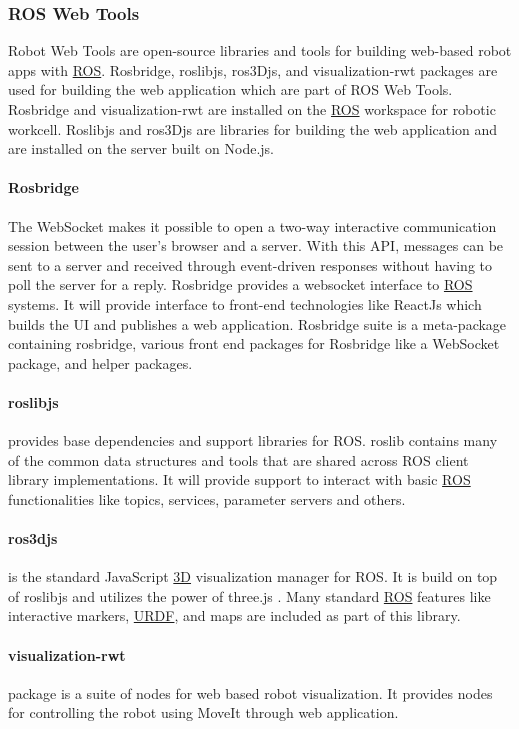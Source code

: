 \subsubsection{ROS Web Tools}
\label{subsubsec:rosweb}

Robot Web Tools are open-source libraries and tools for building web-based robot apps with \hyperref[acro:ROS]{ROS}. Rosbridge, roslibjs, ros3Djs, and visualization-rwt packages
are used for building the web application which are part of ROS Web Tools. \cite{webtools} Rosbridge and visualization-rwt are installed on the \hyperref[acro:ROS]{ROS} workspace
for robotic workcell. Roslibjs and ros3Djs are libraries for building the web application and are installed on the server built on Node.js.

\paragraph{Rosbridge}
\label{par:rosbridge}
The WebSocket makes it possible to open a two-way interactive communication session between the user's browser and a server.
With this API, messages can be sent to a server and received through event-driven responses without having to poll the server for a reply. \cite{websocket}
Rosbridge provides a websocket interface to \hyperref[acro:ROS]{ROS} systems. It will provide interface to front-end technologies like ReactJs which builds the UI
and publishes a web application. Rosbridge suite is a meta-package containing rosbridge, various front end packages for Rosbridge 
like a WebSocket package, and helper packages. \cite{rosbridge}

\paragraph{roslibjs}
\label{par:roslibjs}
provides base dependencies and support libraries for ROS. roslib contains many of the common data structures and tools that are shared across
ROS client library implementations. \cite{roslib} It will provide support to interact with basic \hyperref[acro:ROS]{ROS} functionalities like topics, services, parameter servers and others.

\paragraph{ros3djs}
\label{par:ros3djs}
is the standard JavaScript \hyperref[acro:3D]{3D} visualization manager for ROS. It is build on top of roslibjs and utilizes the power of three.js \cite{threejs}.
Many standard \hyperref[acro:ROS]{ROS} features like interactive markers, \hyperref[acro:URDF]{URDF}, and maps are included as part of this library. \cite{ros3djs}

\paragraph{visualization-rwt}
\label{par:visualization-rwt}
package is a suite of nodes for web based robot visualization. It provides nodes for controlling the robot using MoveIt through web application.
\cite{visualization-rwt}

